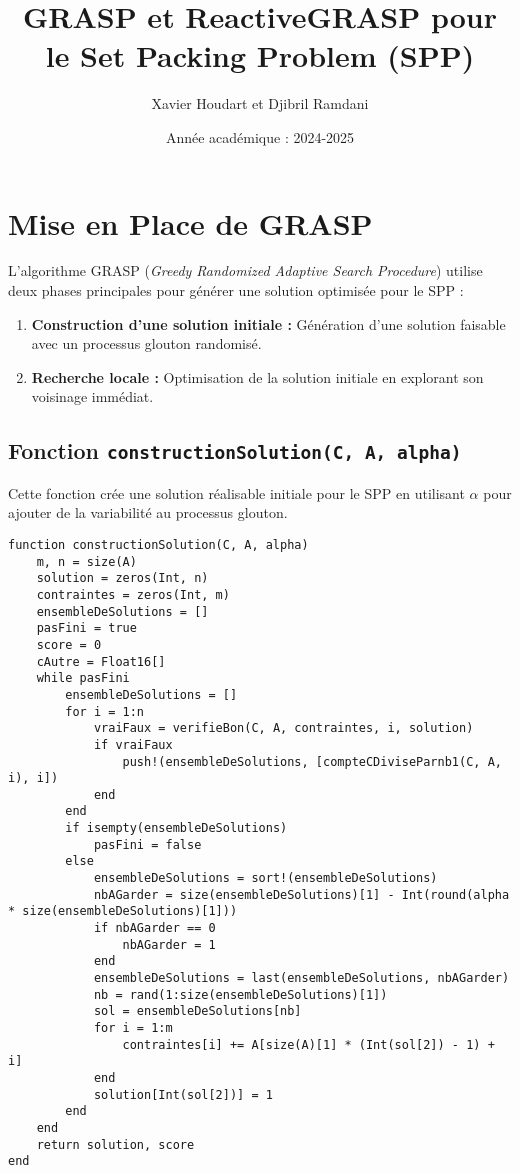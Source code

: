 \begin{minipage}

\title{\textbf{GRASP et ReactiveGRASP pour le Set Packing Problem (SPP)}}
\author{Xavier Houdart et Djibril Ramdani}
\date{Année académique : 2024-2025}
\maketitle

\section*{Mise en Place de GRASP}
L'algorithme GRASP (\textit{Greedy Randomized Adaptive Search Procedure}) utilise deux phases principales pour générer une solution optimisée pour le SPP :
\begin{enumerate}
    \item \textbf{Construction d'une solution initiale :} Génération d'une solution faisable avec un processus glouton randomisé.
    \item \textbf{Recherche locale :} Optimisation de la solution initiale en explorant son voisinage immédiat.
\end{enumerate}

\subsection*{Fonction \texttt{constructionSolution(C, A, alpha)}}
Cette fonction crée une solution réalisable initiale pour le SPP en utilisant $\alpha$ pour ajouter de la variabilité au processus glouton.

\begin{lstlisting}
function constructionSolution(C, A, alpha)
    m, n = size(A)
    solution = zeros(Int, n)
    contraintes = zeros(Int, m)
    ensembleDeSolutions = []
    pasFini = true
    score = 0
    cAutre = Float16[]
    while pasFini
        ensembleDeSolutions = []
        for i = 1:n
            vraiFaux = verifieBon(C, A, contraintes, i, solution)
            if vraiFaux
                push!(ensembleDeSolutions, [compteCDiviseParnb1(C, A, i), i])
            end
        end
        if isempty(ensembleDeSolutions)
            pasFini = false
        else
            ensembleDeSolutions = sort!(ensembleDeSolutions)
            nbAGarder = size(ensembleDeSolutions)[1] - Int(round(alpha * size(ensembleDeSolutions)[1]))
            if nbAGarder == 0
                nbAGarder = 1
            end
            ensembleDeSolutions = last(ensembleDeSolutions, nbAGarder)
            nb = rand(1:size(ensembleDeSolutions)[1])
            sol = ensembleDeSolutions[nb]
            for i = 1:m
                contraintes[i] += A[size(A)[1] * (Int(sol[2]) - 1) + i]
            end
            solution[Int(sol[2])] = 1
        end
    end
    return solution, score
end
\end{lstlisting}


\end{minipage}
